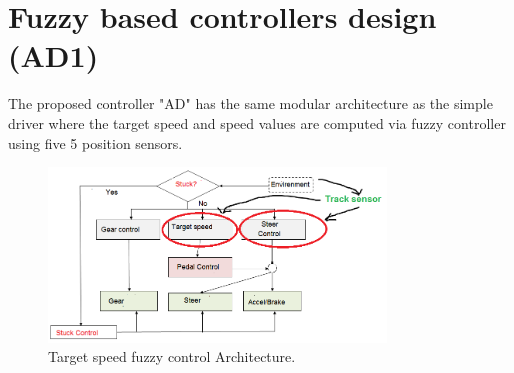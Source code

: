\documentclass{llncs}
\begin{document}
\section{Fuzzy based controllers design (AD1)}
The proposed controller "AD" has the same modular architecture as the simple driver where the target speed  and speed values are  computed via fuzzy controller using five 5 position sensors.



\begin{figure}[h!]
	
	\centering
	\includegraphics[width=0.8\textwidth]{fig/speedcible3.png}
	\begin{minipage}{10cm}
		\centering
		\caption{\footnotesize Target speed fuzzy control Architecture.}
		\label{archi2}
	\end{minipage} 
\end{figure}
\end{document}
